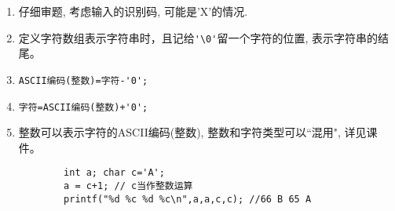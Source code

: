 \begin{note}[要点]
	\begin{enumerate}
		\item 仔细审题, 考虑输入的识别码, 可能是'X'的情况.
		\item 定义字符数组表示字符串时，且记给\lstinline|'\0'|留一个字符的位置, 表示字符串的结尾。
		\item \lstinline|ASCII编码(整数)=字符-'0';|
		\item \lstinline|字符=ASCII编码(整数)+'0';|
		\item 整数可以表示字符的ASCII编码(整数), 整数和字符类型可以``混用", 详见课件。
		\begin{lstlisting}
		int a; char c='A';
		a = c+1; // c当作整数运算
		printf("%d %c %d %c\n",a,a,c,c); //66 B 65 A 
		\end{lstlisting}
	\end{enumerate}
\end{note}

